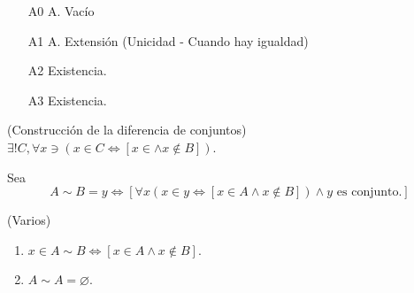 \begin{cajita}
	\begin{enumerate}
		\item[A0] A. Vacío 
		\item[A1] A. Extensión (Unicidad - Cuando hay igualdad)
		\item[A2] Existencia.
		\item[A3] Existencia. 
	\end{enumerate}
\end{cajita}

\begin{teorema}(Construcción de la diferencia de conjuntos)
	$\exists ! C, \forall x \ni (x\in C\iff [x\in \wedge x\not\in B])$.
\end{teorema}

\begin{definicion}
	Sea
	$$A\sim B = y\iff \left[\forall x(x\in y\iff [x\in A\wedge x\not\in B])\wedge y \text{ es conjunto.}\right]$$
\end{definicion}

\begin{teorema}(Varios)
	\begin{enumerate}
		\item $x\in A \sim B\iff [x\in A\wedge x\not\in B]$. 
		\item $A\sim A=\varnothing$. 
	\end{enumerate}
\end{teorema}
